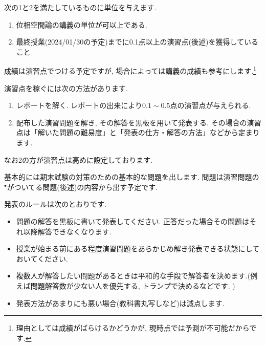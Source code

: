 \documentclass[dvipdfmx,a4paper,11pt]{article}
\theoremstyle{definition}
\begin{document}
次の1と2を満たしているものに単位を与えます.
\begin{enumerate}
  \setlength{\parskip}{0cm} %
  \setlength{\itemsep}{0cm} %
\item 位相空間論の講義の単位が可以上である.
\item 最終授業(2024/01/30の予定)までに0.1点以上の演習点(後述)を獲得していること
\end{enumerate}
成績は演習点でつける予定ですが, 場合によっては講義の成績も参考にします.\footnote{理由としては成績がばらけるかどうかが, 現時点では予測が不可能だからです. }

\medskip
{}

演習点を稼ぐには次の方法があります.
\begin{enumerate}
  \setlength{\parskip}{0cm} 
  \setlength{\itemsep}{0cm} 
\item レポートを解く. レポートの出来により$0.1\sim0.5$点の演習点が与えられる.
\item 配布した演習問題を解き, その解答を黒板を用いて発表する. その場合の演習点は「解いた問題の難易度」と「発表の仕方・解答の方法」などから定まります.
\end{enumerate}

なお2の方が演習点は高めに設定しております.


\medskip
{}

基本的には期末試験の対策のための基本的な問題を出します.  問題は演習問題の$^{\bullet}$がついてる問題(後述)の内容から出す予定です.

\newpage
{}

発表のルールは次のとおりです.
\begin{itemize}
  \setlength{\parskip}{0cm} 
  \setlength{\itemsep}{0cm} 
\item 問題の解答を黒板に書いて発表してください. 正答だった場合その問題はそれ以降解答できなくなります. %
\item  授業が始まる前にある程度演習問題をあらかじめ解き発表できる状態にしておいてください.
\item 複数人が解答したい問題があるときは平和的な手段で解答者を決めます.(例えば問題解答数が少ない人を優先する, トランプで決めるなどです. )
\item 発表方法があまりにも悪い場合(教科書丸写しなど)は減点します.
\end{itemize}
\end{document}
